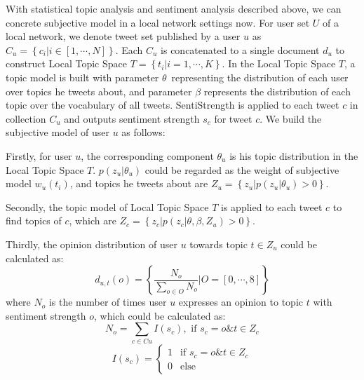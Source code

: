\begin{landscape}
With statistical topic analysis and sentiment analysis described above, we can concrete subjective model in a local network settings now. 
For user set $ U $ of a local network, we denote tweet set published by a user $ u $ as $ C_{u}=\left\lbrace c_{i} \vert i \in \left[ 1, \cdots, N \right]  \right\rbrace$. Each $ C_{u} $ is concatenated to a single document $ d_{u} $ to construct Local Topic Space $ T=\left\lbrace t_{i} \vert i=1, \cdots, K \right\rbrace $.
In the Local Topic Space $ T $, a topic model is built with parameter $ \theta $\ representing the distribution of each user over topics he tweets about, and
parameter $ \beta $ represents the distribution of each topic over the vocabulary of all tweets. SentiStrength is applied to each tweet $ c $ in collection $ C_{u} $ and outputs sentiment strength $ s_{c} $ for tweet $ c $. 
We build the subjective model of user $ u $ as follows:
\begin{itemize*}
\item Firstly, for user $ u $, the corresponding component $ \theta_{u} $ is his topic distribution in the Local Topic Space $ T $. $ p\left( z_{u} \vert \theta_{u} \right)  $ could be regarded as the weight of subjective model $ w_{u} \left( t_{i} \right)  $, and topics he tweets about are $ Z_{u}= \left\lbrace z_{u} \vert p\left( z_{u} \vert \theta_{u} \right)>0 \right\rbrace $.
\item Secondly, the topic model of Local Topic Space $ T $ is applied to each tweet $ c $ to find topics of $ c $, which are $ Z_{c} =\left\lbrace z_{c} \vert p\left( z_{c} \vert \theta, \beta, Z_{u} \right)>0 \right\rbrace $.
\item Thirdly, the opinion distribution of user $ u $ towards topic $ t \in Z_{u} $ could be calculated as:
\begin{equation}
\label{opinionall}
d_{u,t}\left( o \right) = \left\lbrace \dfrac{N_{o}}{\sum_{o \in O} N_{o}} \vert O=\left[ 0, \cdots, 8 \right] \right\rbrace 
\end{equation}
where $ N_{o} $ is the number of times user $ u $ expresses an opinion to topic $ t $ with sentiment strength $ o $, which could be calculated as:
\begin{equation}
\label{opinion1}
N_{o}=\sum_{c \in Cu} I\left( s_{c} \right) , \text{ if } s_{c}=o \& t \in Z_{c}
\end{equation}
\begin{equation}
\label{opinion2}
I\left( s_{c} \right)=\left\{
\begin{array}{ll}
{1} & \text{if } s_{c}=o \& t \in Z_{c}\\
{0} & \text{else}
\end{array}
\right.
\end{equation}


\end{itemize*}
\end{landscape}
